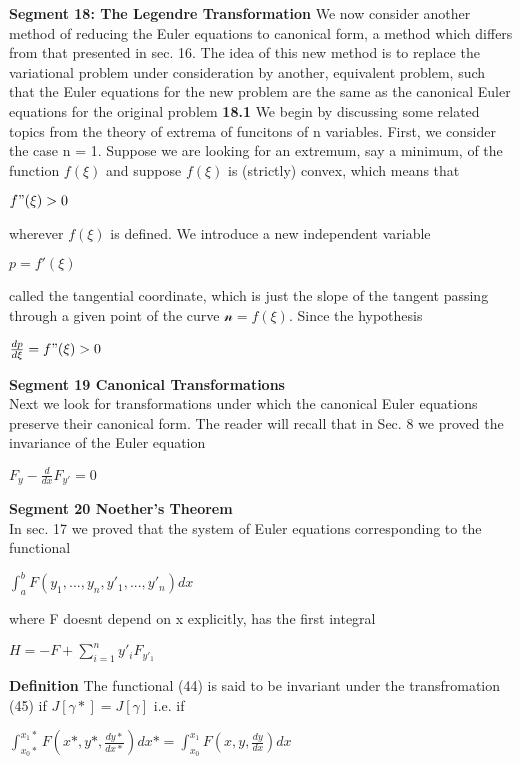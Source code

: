\documentclass{article}
\begin{document}
\textbf {Segment 18: The Legendre Transformation} We now consider another method of reducing the Euler equations to canonical form, a method which differs from that presented in sec. 16. The idea of this new method is to replace the variational problem under consideration by another, equivalent problem, such that the Euler equations for the new problem are the same as the canonical Euler equations for the original problem
\textbf {18.1} We begin by discussing some related topics from the theory of extrema of funcitons of n variables. First, we consider the case n = 1. Suppose we are looking for an extremum, say a minimum, of the function $f(\xi)$ and suppose $f(\xi)$ is (strictly) convex, which means that 
\begin{center}
$f"(\xi) > 0$
\end{center}
wherever $f(\xi)$ is defined. We introduce a new independent variable
\begin{center}
$p = f'(\xi)$
\end{center}
called the tangential coordinate, which is just the slope of the tangent passing through a given point of the curve $\mathcal{n} = f(\xi)$. Since the hypothesis
\begin{center}
$\frac{dp}{d\xi} = f"(\xi) > 0$
\end{center}

\textbf {Segment 19 Canonical Transformations} \\ Next we look for transformations under which the canonical Euler equations preserve their canonical form. The reader will recall that in Sec. 8 we proved the invariance of the Euler equation
\begin{center}
$F_y - \frac{d}{dx} F_{y'} = 0$
\end{center}

\textbf {Segment 20 Noether's Theorem} \\ In sec. 17 we proved that the system of Euler equations corresponding to the functional 
\begin{center}
$\int_a^b F(y_1 ,..., y_n , y'_1 ,..., y'_n) dx$
\end{center}
where F doesnt depend on x explicitly, has the first integral
\begin{center}
$H = -F + \sum_{i=1}^n y'_i F_{y'_1}$
\end{center}

\textbf {Definition} The functional (44) is said to be invariant under the transfromation (45) if $J[\gamma *] = J [\gamma]$ i.e. if 
\begin{center}
$\int_{x_0*}^{x_1*} F( x*, y*, \frac{dy*}{dx*}) dx* = \int_{x_0}^{x_1} F(x, y, \frac{dy}{dx}) dx$
\end{center}
\end{document}
